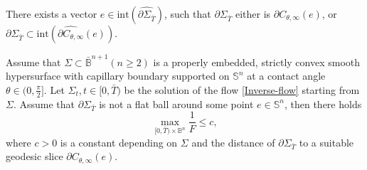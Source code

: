 \documentclass[10pt,a4paper]{amsart}
\begin{document}
\begin{lem}\label{lem-rigidity}
	There exists a vector $e\in \mathrm{int}(\widehat{\partial\Sigma_{\bar{T}}})$, such that $\partial\Sigma_{\bar{T}}$ either is $\partial C_{\theta,\infty}(e)$, or $\partial\Sigma_{\bar{T}}\subset\mathrm{int}(\widehat{\partial C_{\theta,\infty}}(e))$.
\end{lem}

\begin{lem}\label{lowbound-F}
	Assume that $\Sigma\subset\bar{\mathbb{B}}^{n+1} (n\geq 2)$ is a properly embedded, strictly convex smooth hypersurface with capillary boundary supported on $\mathbb{S}^n$ at a contact angle $\theta\in(0,\frac{\pi}{2}]$. Let $\Sigma_t,t\in[0,\bar{T})$ be the solution of the flow \eqref{Inverse-flow} starting from $\Sigma$. Assume that $\partial\Sigma_{\bar{T}}$ is not a flat ball around some point $e\in\mathbb{S}^n$, then there holds
	\begin{equation}\label{lower-F}
		\max_{[0,\bar{T})\times\mathbb{B}^n}{\frac{1}{F}}\leq c,
	\end{equation}
where $c>0$ is a constant depending on $\Sigma$ and the distance of $\partial\Sigma_{\bar{T}}$ to a suitable geodesic slice $\partial C_{\theta,\infty}(e)$.
\end{lem}
\end{document}
